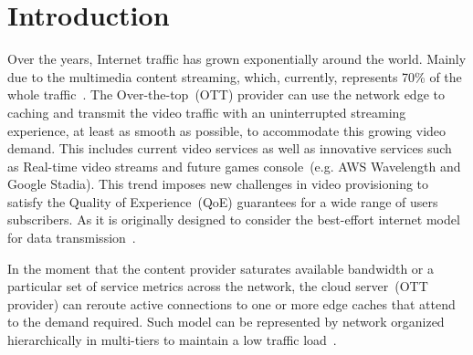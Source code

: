 \section{Introduction}
\label{sec:introduction}


Over the years, Internet traffic has grown exponentially around the world. Mainly due to the multimedia content streaming, which, currently, represents 70\% of the whole traffic~\cite{cisco:forecast}. 
The Over-the-top~(OTT) provider can use the network edge to caching and transmit the video traffic with an uninterrupted streaming experience, at least as smooth as possible, to accommodate this growing video demand. This includes current video services as well as innovative services such as Real-time video streams and future games console~(e.g. AWS Wavelength and Google Stadia).
This trend imposes new challenges in video provisioning to satisfy the Quality of Experience~(QoE) guarantees for a wide range of users subscribers. As it is originally designed to consider the best-effort internet model for data transmission~\cite{gamaUCC2019, DBLP:CoRR:2021, ye:ITC17}.

In the moment that the content provider saturates available bandwidth or a particular set of service metrics across the network, the cloud server~(OTT provider) can reroute active connections to one or more edge caches that attend to the demand required. Such model can be represented by network organized hierarchically in multi-tiers to maintain a low traffic load~\cite{rosarioSENSORS2018}.

